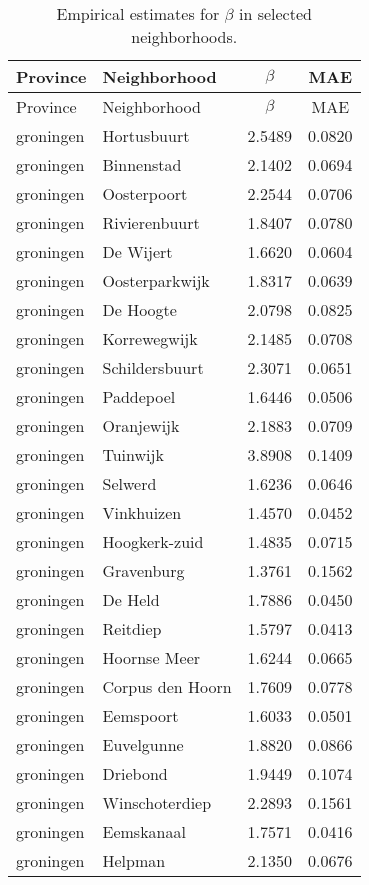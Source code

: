 \begin{longtable}{llcc}
\caption{Empirical estimates for $\beta$ in selected neighborhoods.} \label{tab:results}\\
\hline
Province & Neighborhood & $\beta$ & MAE \\
\hline
\endfirsthead
\hline
Province & Neighborhood & $\beta$ & MAE \\
\hline
\endhead
groningen & Hortusbuurt & 2.5489 & 0.0820 \\
groningen & Binnenstad & 2.1402 & 0.0694 \\
groningen & Oosterpoort & 2.2544 & 0.0706 \\
groningen & Rivierenbuurt & 1.8407 & 0.0780 \\
groningen & De Wijert & 1.6620 & 0.0604 \\
groningen & Oosterparkwijk & 1.8317 & 0.0639 \\
groningen & De Hoogte & 2.0798 & 0.0825 \\
groningen & Korrewegwijk & 2.1485 & 0.0708 \\
groningen & Schildersbuurt & 2.3071 & 0.0651 \\
groningen & Paddepoel & 1.6446 & 0.0506 \\
groningen & Oranjewijk & 2.1883 & 0.0709 \\
groningen & Tuinwijk & 3.8908 & 0.1409 \\
groningen & Selwerd & 1.6236 & 0.0646 \\
groningen & Vinkhuizen & 1.4570 & 0.0452 \\
groningen & Hoogkerk-zuid & 1.4835 & 0.0715 \\
groningen & Gravenburg & 1.3761 & 0.1562 \\
groningen & De Held & 1.7886 & 0.0450 \\
groningen & Reitdiep & 1.5797 & 0.0413 \\
groningen & Hoornse Meer & 1.6244 & 0.0665 \\
groningen & Corpus den Hoorn & 1.7609 & 0.0778 \\
groningen & Eemspoort & 1.6033 & 0.0501 \\
groningen & Euvelgunne & 1.8820 & 0.0866 \\
groningen & Driebond & 1.9449 & 0.1074 \\
groningen & Winschoterdiep & 2.2893 & 0.1561 \\
groningen & Eemskanaal & 1.7571 & 0.0416 \\
groningen & Helpman & 2.1350 & 0.0676 \\

\end{longtable}
